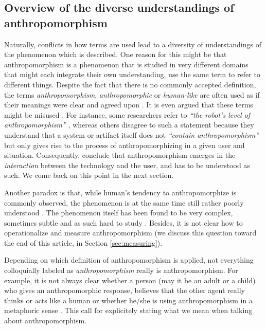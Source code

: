 \documentclass{frontiersSCNS} %
\newcommand{\eg}{{\textit{e.g.~}}}
\begin{document}

\subsection{Overview of the diverse understandings of anthropomorphism}

Naturally, conflicts in how terms are used lead to a diversity of understandings
of the phenomenon which is described.  One reason for this might be that
anthropomorphism is a phenomenon that is studied in very different domains that
might each integrate their own understanding, use the same term to refer to
different things.  Despite the fact that there is no commonly accepted
definition, the terms \textit{anthropomorphism}, \textit{anthropomorphic} or
\textit{human-like} are often used as if their meanings were clear and agreed
upon \citep{persson_anthropomorphism_2000}. It is even argued that these terms
might be misused \citep{duffy_anthropomorphism_2002,epley_when_2008}.  For
instance, some researchers refer to \textit{``the robot's level of
anthropomorphism''} \citep{bartneck_is_2007}, whereas others disagree to such a
statement because they understand that a system or artifact itself does not
\textit{``contain anthropomorphism''} but only gives rise to the process of
anthropomorphizing in a given user and situation. Consequently,
\cite{persson_anthropomorphism_2000} conclude that anthropomorphism emerges in
the \textit{interaction} between the technology and the user, and has to be
understood as such. We come back on this point in the next section.


Another paradox is that, while human's tendency to anthropomorphize is commonly
observed, the phenomenon is at the same time still rather poorly understood
\citep{epley_seeing_2007}. The phenomenon itself has been found to be very
complex, sometimes subtle and as such hard to study
\citep{duffy_anthropomorphism_2002,epley_when_2008}. Besides, it is not clear
how to operationalize and measure anthropomorphism (we discuss this question
toward the end of this article, in Section \ref{sec:measuring}).

Depending on which definition of anthropomorphism is applied, not everything 
colloquially labeled as \emph{anthropomorphism} really is anthropomorphism.
For example, it is not always clear whether a person (may it be an adult or 
a child) who gives an anthropomorphic response, believes that the other agent really 
thinks or acts like a human or whether he/she is using anthropomorphism in a metaphoric 
sense \citep{leeds_childrens_1992}.
This call for explicitely stating what we mean when talking about anthropomorphism. 
\end{document}
